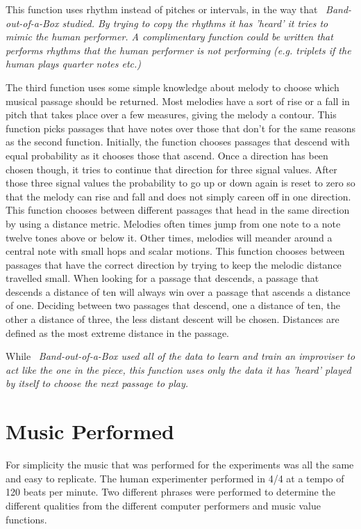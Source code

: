 \documentclass[12pt]{ucthesis}
\begin{document}
This function uses rhythm instead of pitches or intervals, in the way that ~\em{Band-out-of-a-Box }\em studied. By trying to copy the rhythms it has 'heard' it tries to mimic the human performer. A complimentary function could be written that performs rhythms that the human performer is not performing (e.g. triplets if the human plays quarter notes etc.)

The third function uses some simple knowledge about melody to choose which musical passage should be returned. Most melodies have a sort of rise or a fall in pitch that takes place over a few measures, giving the melody a contour. This function picks passages that have notes over those that don't for the same reasons as the second function. Initially, the function chooses passages that descend with equal probability as it chooses those that ascend. Once a direction has been chosen though, it tries to continue that direction for three signal values. After those three signal values the probability to go up or down again is reset to zero so that the melody can rise and fall and does not simply careen off in one direction. This function chooses between different passages that head in the same direction by using a distance metric. Melodies often times jump from one note to a note twelve tones above or below it. Other times, melodies will meander around a central note with small hops and scalar motions. This function chooses between passages that have the correct direction by trying to keep the melodic distance travelled small. When looking for a passage that descends, a passage that descends a distance of ten will always win over a passage that ascends a distance of one. Deciding between two passages that descend, one a distance of ten, the other a distance of three, the less distant descent will be chosen. Distances are defined as the most extreme distance in the passage.

While ~\em{Band-out-of-a-Box }\em used all of the data to learn and train an improviser to act like the one in the piece, this function uses only the data it has 'heard' played by itself to choose the next passage to play. 

\section{Music Performed}
\label{music-performed}
For simplicity the music that was performed for the experiments was all the same and easy to replicate. The human experimenter performed in 4/4 at a tempo of 120 beats per minute. Two different phrases were performed to determine the different qualities from the different computer performers and music value functions. 
\end{document}

